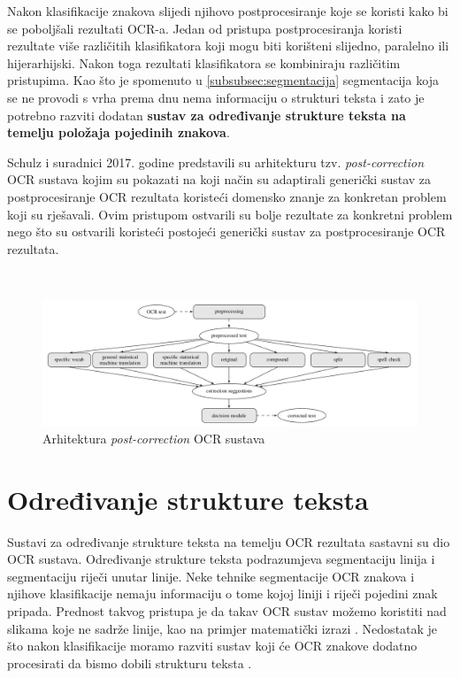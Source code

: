 \documentclass[times, utf8, zavrsni]{fer}
\begin{document}
Nakon klasifikacije znakova slijedi njihovo postprocesiranje koje se koristi kako
bi se poboljšali rezultati OCR-a. Jedan od pristupa postprocesiranja koristi rezultate
više različitih klasifikatora koji mogu biti korišteni slijedno, paralelno ili hijerarhijski.
Nakon toga rezultati klasifikatora se kombiniraju različitim pristupima. \citep{DBLP:journals/corr/abs-1710-05703}
Kao što je spomenuto u \ref{subsubsec:segmentacija} segmentacija koja se ne provodi s vrha prema
dnu nema informaciju o strukturi teksta i zato je potrebno razviti dodatan
\textbf{sustav za određivanje strukture teksta na temelju položaja pojedinih znakova}.

Schulz i suradnici \citep{schulz2017multi} 2017. godine predstavili su arhitekturu
tzv. \emph{post-correction} OCR sustava kojim su pokazati na koji način su
adaptirali generički sustav za postprocesiranje OCR rezultata koristeći domensko znanje
za konkretan problem koji su rješavali. Ovim pristupom ostvarili su bolje rezultate
za konkretni problem nego što su ostvarili koristeći postojeći generički sustav za
postprocesiranje OCR rezultata.

\

\begin{figure}[htb]
    \centering
    \includegraphics[width=\textwidth]{images/post-correction-example-01.png}
    \caption{Arhitektura \emph{post-correction} OCR sustava \citep{schulz2017multi}}
    \label{fig:post-correction-example-01}
\end{figure}

\chapter{Određivanje strukture teksta}
Sustavi za određivanje strukture teksta na temelju OCR rezultata sastavni su dio OCR sustava. Određivanje strukture teksta
podrazumjeva segmentaciju linija i segmentaciju riječi unutar linije. Neke tehnike segmentacije
OCR znakova i njihove klasifikacije nemaju informaciju o tome kojoj liniji i riječi pojedini znak pripada.
Prednost takvog pristupa je da takav OCR sustav možemo koristiti nad slikama koje ne sadrže linije,
kao na primjer matematički izrazi \citep{Jurin:2017:Master}. Nedostatak je što nakon klasifikacije
moramo razviti sustav koji će OCR znakove dodatno procesirati da bismo dobili strukturu teksta \citep{Jurin:2017:Master}.
\end{document}
